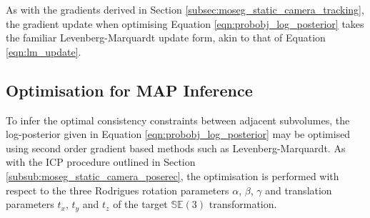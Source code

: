 As with the gradients derived in Section \ref{subsec:moseg_static_camera_tracking}, the 
gradient update when optimising Equation \ref{eqn:probobj_log_posterior} takes the familiar 
Levenberg-Marquardt update form, akin to that of Equation \ref{eqn:lm_update}.

\subsection{Optimisation for MAP Inference}
\label{subsec:probobj_map_optimisation}
To infer the optimal consistency constraints between adjacent subvolumes, the
log-posterior given in Equation \ref{eqn:probobj_log_posterior} may be optimised
using second order gradient based methods such as Levenberg-Marquardt. As with
the ICP procedure outlined in Section \ref{subsub:moseg_static_camera_poserec},
the optimisation is performed with respect to the three Rodrigues rotation
parameters $\alpha$, $\beta$, $\gamma$ and translation parameters $t_{x}$,
$t_{y}$ and $t_{z}$ of the target $\mathbb{SE}(3)$ transformation.

